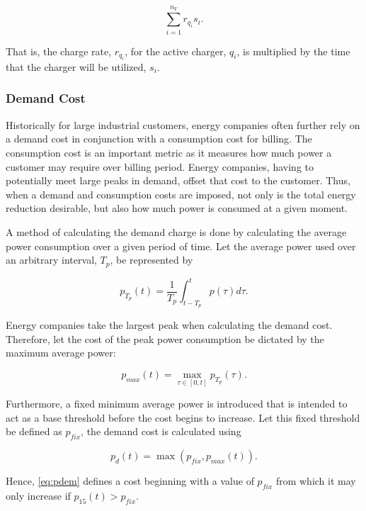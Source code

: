 \documentclass[ee,thesis]{usuthesis}
\begin{document}
\begin{equation}
\label{eq:consumption-cost}
\sum_{i=1}^{n_V} r_{q_i}s_i\text{.}
\end{equation}

That is, the charge rate, \(r_{q_i}\), for the active charger, \(q_i\), is multiplied by the time that the charger will be
utilized, \(s_i\).

\subsubsection{Demand Cost}
\label{sec:demand-cost}
Historically for large industrial customers, energy companies often further rely on a demand cost in conjunction with a
consumption cost for billing. The consumption cost is an important metric as it measures how much power a customer may
require over billing period. Energy companies, having to potentially meet large peaks in demand, offset that cost to the
customer. Thus, when a demand and consumption costs are imposed, not only is the total energy reduction desirable, but
also how much power is consumed at a given moment.

A method of calculating the demand charge is done by calculating the average power consumption over a given period of
time. Let the average power used over an arbitrary interval, \(T_p\), be represented by

\begin{equation}
\label{eq:p}
p_{T_p}(t) = \frac{1}{T_p} \int_{t-T_p}^{t} p(\tau) d\tau\text{.}
\end{equation}

Energy companies take the largest peak when calculating the demand cost. Therefore, let the cost of the peak power
consumption be dictated by the maximum average power:

\begin{equation}
\label{eq:pmax}
p_{max}(t) = \max\limits_{\tau \in [0,t]}p_{T_p}(\tau)\text{.}
\end{equation}

Furthermore, a fixed minimum average power is introduced that is intended to act as a base threshold before the cost
begins to increase. Let this fixed threshold be defined as \(p_{fix}\), the demand cost is calculated using

\begin{equation}
\label{eq:pdem}
p_d(t) = \max(p_{fix},p_{max}(t))\text{.}
\end{equation}

Hence, \ref{eq:pdem} defines a cost beginning with a value of \(p_{fix}\) from which it may only increase if \(p_{15}(t) >
p_{fix}\).
\end{document}
